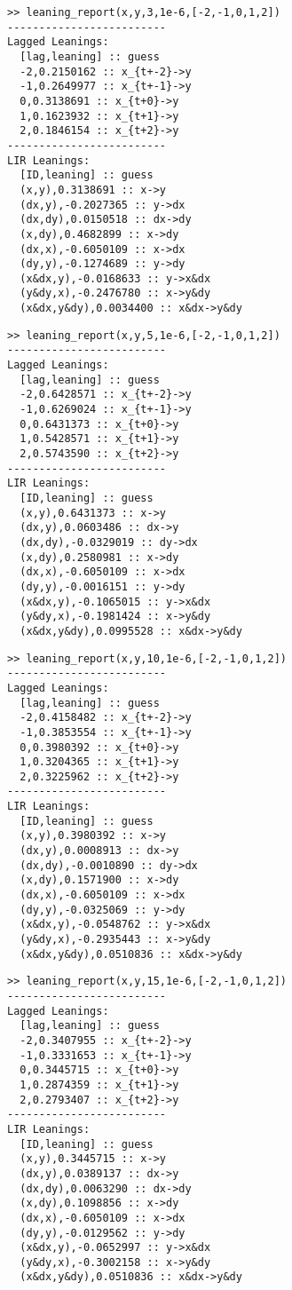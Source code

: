 \documentclass[a4paper,11pt]{article}
\begin{document}
\begin{verbatim}
>> leaning_report(x,y,3,1e-6,[-2,-1,0,1,2])
-------------------------
Lagged Leanings:
  [lag,leaning] :: guess
  -2,0.2150162 :: x_{t+-2}->y
  -1,0.2649977 :: x_{t+-1}->y
  0,0.3138691 :: x_{t+0}->y
  1,0.1623932 :: x_{t+1}->y
  2,0.1846154 :: x_{t+2}->y
-------------------------
LIR Leanings:
  [ID,leaning] :: guess
  (x,y),0.3138691 :: x->y
  (dx,y),-0.2027365 :: y->dx
  (dx,dy),0.0150518 :: dx->dy
  (x,dy),0.4682899 :: x->dy
  (dx,x),-0.6050109 :: x->dx
  (dy,y),-0.1274689 :: y->dy
  (x&dx,y),-0.0168633 :: y->x&dx
  (y&dy,x),-0.2476780 :: x->y&dy
  (x&dx,y&dy),0.0034400 :: x&dx->y&dy
\end{verbatim} 
\begin{verbatim}
>> leaning_report(x,y,5,1e-6,[-2,-1,0,1,2])
-------------------------
Lagged Leanings:
  [lag,leaning] :: guess
  -2,0.6428571 :: x_{t+-2}->y
  -1,0.6269024 :: x_{t+-1}->y
  0,0.6431373 :: x_{t+0}->y
  1,0.5428571 :: x_{t+1}->y
  2,0.5743590 :: x_{t+2}->y
-------------------------
LIR Leanings:
  [ID,leaning] :: guess
  (x,y),0.6431373 :: x->y
  (dx,y),0.0603486 :: dx->y
  (dx,dy),-0.0329019 :: dy->dx
  (x,dy),0.2580981 :: x->dy
  (dx,x),-0.6050109 :: x->dx
  (dy,y),-0.0016151 :: y->dy
  (x&dx,y),-0.1065015 :: y->x&dx
  (y&dy,x),-0.1981424 :: x->y&dy
  (x&dx,y&dy),0.0995528 :: x&dx->y&dy
\end{verbatim} 
\begin{verbatim}
>> leaning_report(x,y,10,1e-6,[-2,-1,0,1,2])
-------------------------
Lagged Leanings:
  [lag,leaning] :: guess
  -2,0.4158482 :: x_{t+-2}->y
  -1,0.3853554 :: x_{t+-1}->y
  0,0.3980392 :: x_{t+0}->y
  1,0.3204365 :: x_{t+1}->y
  2,0.3225962 :: x_{t+2}->y
-------------------------
LIR Leanings:
  [ID,leaning] :: guess
  (x,y),0.3980392 :: x->y
  (dx,y),0.0008913 :: dx->y
  (dx,dy),-0.0010890 :: dy->dx
  (x,dy),0.1571900 :: x->dy
  (dx,x),-0.6050109 :: x->dx
  (dy,y),-0.0325069 :: y->dy
  (x&dx,y),-0.0548762 :: y->x&dx
  (y&dy,x),-0.2935443 :: x->y&dy
  (x&dx,y&dy),0.0510836 :: x&dx->y&dy
\end{verbatim} 
\begin{verbatim}
>> leaning_report(x,y,15,1e-6,[-2,-1,0,1,2])
-------------------------
Lagged Leanings:
  [lag,leaning] :: guess
  -2,0.3407955 :: x_{t+-2}->y
  -1,0.3331653 :: x_{t+-1}->y
  0,0.3445715 :: x_{t+0}->y
  1,0.2874359 :: x_{t+1}->y
  2,0.2793407 :: x_{t+2}->y
-------------------------
LIR Leanings:
  [ID,leaning] :: guess
  (x,y),0.3445715 :: x->y
  (dx,y),0.0389137 :: dx->y
  (dx,dy),0.0063290 :: dx->dy
  (x,dy),0.1098856 :: x->dy
  (dx,x),-0.6050109 :: x->dx
  (dy,y),-0.0129562 :: y->dy
  (x&dx,y),-0.0652997 :: y->x&dx
  (y&dy,x),-0.3002158 :: x->y&dy
  (x&dx,y&dy),0.0510836 :: x&dx->y&dy
\end{verbatim}
\end{document}
